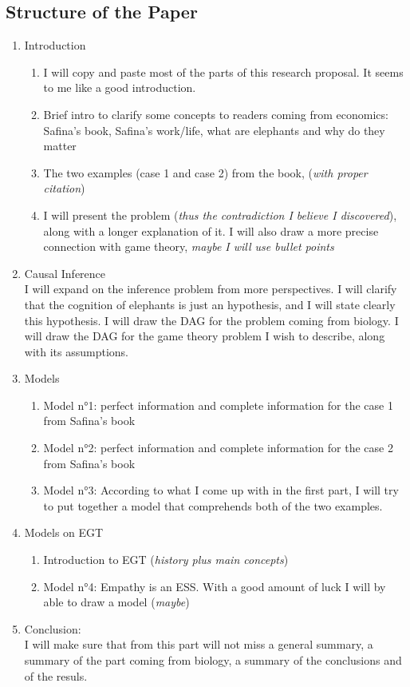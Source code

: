 \newpage
\subsection*{Structure of the Paper}
\begin{enumerate}
    \item Introduction
        \begin{enumerate}
            \item I will copy and paste most of the parts of this research proposal. It seems to me like a good introduction.
            \item Brief intro to clarify some concepts to readers coming from economics: Safina's book, Safina's work/life, what are elephants and why do they matter
            \item The two examples (case 1 and case 2) from the book, (\textit{with proper citation})
            \item I will present the problem (\textit{thus the contradiction I believe I discovered}), along with a longer explanation of it. I will also draw a more precise connection with game theory, \textit{maybe I will use bullet points}
        \end{enumerate}
    \item Causal Inference \\ I will expand on the inference problem from more perspectives. I will clarify that the cognition of elephants is just an hypothesis, and I will state clearly this hypothesis. I will draw the DAG for the problem coming from biology. I will draw the DAG for the game theory problem I wish to describe, along with its assumptions.
    \item Models
        \begin{enumerate}
            \item Model n°1: perfect information and complete information for the case 1 from Safina's book
            \item Model n°2: perfect information and complete information for the case 2 from Safina's book
            \item Model n°3: According to what I come up with in the first part, I will try to put together a model that comprehends both of the two examples.
        \end{enumerate}
    \item Models on EGT
        \begin{enumerate}
            \item Introduction to EGT (\textit{history plus main concepts})
            \item Model n°4: Empathy is an ESS. With a good amount of luck I will by able to draw a model (\textit{maybe})
        \end{enumerate}
    \item Conclusion:\\I will make sure that from this part will not miss a general summary, a summary of the part coming from biology, a summary of the conclusions and of the resuls.
\end{enumerate}
